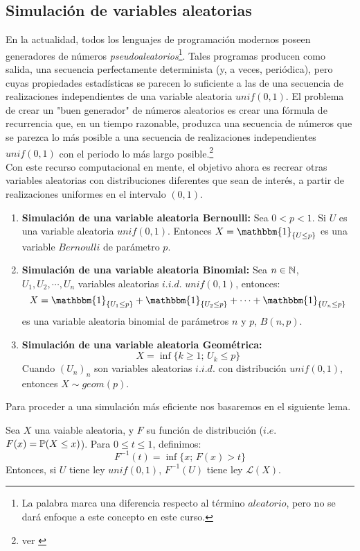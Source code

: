 \subsection{Simulación de variables aleatorias}
En la actualidad, todos los lenguajes de programación modernos poseen generadores de números \textit{pseudoaleatorios}\footnote{La palabra marca una diferencia respecto al término $aleatorio$, pero no se dará enfoque a este concepto en este curso.}. Tales programas producen como salida, una secuencia perfectamente determinista (y, a veces, periódica), pero cuyas propiedades estadísticas se parecen lo suficiente a las de una secuencia de realizaciones independientes de una variable aleatoria $unif(0,1)$. El problema de crear un "buen generador" de números aleatorios es crear una fórmula de recurrencia que, en un tiempo razonable, produzca una secuencia de números que se parezca lo más posible a una secuencia de realizaciones independientes $unif(0,1)$ con el periodo lo más largo posible.\footnote{ver  \cite[cap. 1]{Pard}}\\ Con este recurso computacional en mente, el objetivo ahora es recrear otras variables aleatorias con distribuciones diferentes que sean de interés, a partir de realizaciones uniformes en el intervalo $(0,1)$.\\ \newline
\begin{enumerate}
    \item \textbf{Simulación de una variable aleatoria Bernoulli:} Sea $0<p<1$. Si $U$ es una variable aleatoria $unif(0,1)$. Entonces $X=\mathbbm{1}_{\{U \leq p\}}$ es una variable $Bernoulli$ de parámetro $p$.
    \item \textbf{Simulación de una variable aleatoria Binomial:} Sea $n\in\mathbb N$, $U_1,U_2,\cdots,U_n$ variables aleatorias $i.i.d.$ $unif(0,1)$, entonces:
    \[X=\mathbbm{1}_{\{U_1\leq p\}} + \mathbbm{1}_{\{U_2\leq p\}}+\cdots + \mathbbm{1}_{\{U_n \leq p\}}\]
    es una variable aleatoria binomial de parámetros $n$ y $p$, $B(n,p)$.
    \item \textbf{Simulación de una variable aleatoria Geométrica:}
    \[X = \inf\{k\geq 1;\,U_k\leq p\}\]
    Cuando $(U_n)_n$ son variables aleatorias $i.i.d.$ con distribución $unif(0,1)$, \\entonces $X\sim geom(p)$.
\end{enumerate}
Para proceder a una simulación más eficiente nos basaremos en el siguiente lema.

\begin{lem} Sea $X$ una vaiable aleatoria, y $F$ su función de distribución ($i.e.$ $F(x) = \mathbb{P}(X\leq x)$). Para $0\leq t\leq 1$, definimos:
\[F^{-1}(t) = \inf\{x;\,F(x)>t\}\]
Entonces, si $U$ tiene ley $unif(0,1)$, $F^{-1}(U)$ tiene ley $\mathcal{L}(X)$.
\end{lem}

